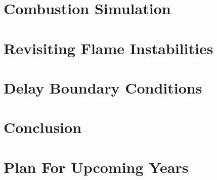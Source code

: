 \documentclass[lmr,second,hyperref,rgb,hyperref,dvipsnames]{uom_thesis_casson}
\begin{document}
\makeatletter
\title{\xmp@Title}
\author{\xmp@Author}
\makeatother





\uomtoc


\uomstartmainbody %


\chapter{Combustion Simulation} \label{ch:combustion-sim}


\chapter{Revisiting Flame Instabilities} \label{ch:flame-instab}


\chapter{Delay Boundary Conditions} \label{ch:delay-bcs}


\chapter{Conclusion} \label{ch:conc}


\chapter{Plan For Upcoming Years} \label{ch:plan}



\end{document}
